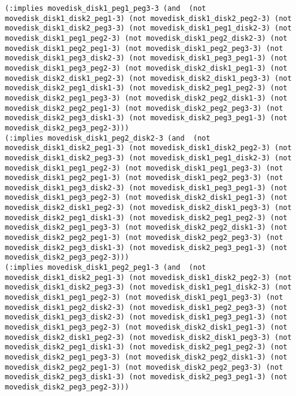 \documentclass[12pt,letterpaper]{ntdhw}
\begin{document}
\begin{enumerate}
\begin{enumerate}
\begin{lstlisting}[language=pddl, style=pddlstyle,
  basicstyle=\scriptsize]
(:implies movedisk_disk1_peg1_peg3-3 (and  (not movedisk_disk1_disk2_peg1-3) (not movedisk_disk1_disk2_peg2-3) (not movedisk_disk1_disk2_peg3-3) (not movedisk_disk1_peg1_disk2-3) (not movedisk_disk1_peg1_peg2-3) (not movedisk_disk1_peg2_disk2-3) (not movedisk_disk1_peg2_peg1-3) (not movedisk_disk1_peg2_peg3-3) (not movedisk_disk1_peg3_disk2-3) (not movedisk_disk1_peg3_peg1-3) (not movedisk_disk1_peg3_peg2-3) (not movedisk_disk2_disk1_peg1-3) (not movedisk_disk2_disk1_peg2-3) (not movedisk_disk2_disk1_peg3-3) (not movedisk_disk2_peg1_disk1-3) (not movedisk_disk2_peg1_peg2-3) (not movedisk_disk2_peg1_peg3-3) (not movedisk_disk2_peg2_disk1-3) (not movedisk_disk2_peg2_peg1-3) (not movedisk_disk2_peg2_peg3-3) (not movedisk_disk2_peg3_disk1-3) (not movedisk_disk2_peg3_peg1-3) (not movedisk_disk2_peg3_peg2-3)))
(:implies movedisk_disk1_peg2_disk2-3 (and  (not movedisk_disk1_disk2_peg1-3) (not movedisk_disk1_disk2_peg2-3) (not movedisk_disk1_disk2_peg3-3) (not movedisk_disk1_peg1_disk2-3) (not movedisk_disk1_peg1_peg2-3) (not movedisk_disk1_peg1_peg3-3) (not movedisk_disk1_peg2_peg1-3) (not movedisk_disk1_peg2_peg3-3) (not movedisk_disk1_peg3_disk2-3) (not movedisk_disk1_peg3_peg1-3) (not movedisk_disk1_peg3_peg2-3) (not movedisk_disk2_disk1_peg1-3) (not movedisk_disk2_disk1_peg2-3) (not movedisk_disk2_disk1_peg3-3) (not movedisk_disk2_peg1_disk1-3) (not movedisk_disk2_peg1_peg2-3) (not movedisk_disk2_peg1_peg3-3) (not movedisk_disk2_peg2_disk1-3) (not movedisk_disk2_peg2_peg1-3) (not movedisk_disk2_peg2_peg3-3) (not movedisk_disk2_peg3_disk1-3) (not movedisk_disk2_peg3_peg1-3) (not movedisk_disk2_peg3_peg2-3)))
(:implies movedisk_disk1_peg2_peg1-3 (and  (not movedisk_disk1_disk2_peg1-3) (not movedisk_disk1_disk2_peg2-3) (not movedisk_disk1_disk2_peg3-3) (not movedisk_disk1_peg1_disk2-3) (not movedisk_disk1_peg1_peg2-3) (not movedisk_disk1_peg1_peg3-3) (not movedisk_disk1_peg2_disk2-3) (not movedisk_disk1_peg2_peg3-3) (not movedisk_disk1_peg3_disk2-3) (not movedisk_disk1_peg3_peg1-3) (not movedisk_disk1_peg3_peg2-3) (not movedisk_disk2_disk1_peg1-3) (not movedisk_disk2_disk1_peg2-3) (not movedisk_disk2_disk1_peg3-3) (not movedisk_disk2_peg1_disk1-3) (not movedisk_disk2_peg1_peg2-3) (not movedisk_disk2_peg1_peg3-3) (not movedisk_disk2_peg2_disk1-3) (not movedisk_disk2_peg2_peg1-3) (not movedisk_disk2_peg2_peg3-3) (not movedisk_disk2_peg3_disk1-3) (not movedisk_disk2_peg3_peg1-3) (not movedisk_disk2_peg3_peg2-3)))

\end{lstlisting}
\end{enumerate}
\end{enumerate}
\end{document}
